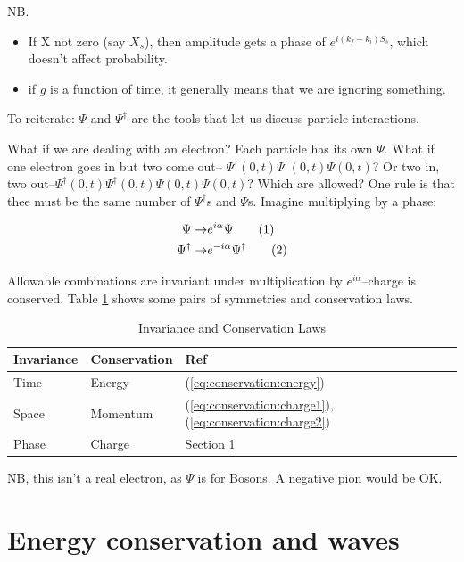 \documentclass[]{article}
\newcommand\numberthis{\addtocounter{equation}{1}\tag{\theequation}}
\begin{document}
NB.\begin{itemize}
	\item  If X not zero (say $X_s$), then amplitude gets a phase of $e^{i(k_f-k_i)S_s}$, which doesn't affect probability.
	\item if $g$ is a function of time, it generally means that we are ignoring something.
\end{itemize}

To reiterate: $\Psi$ and $\Psi^\dagger$ are the tools that let us discuss particle interactions.

What if we are dealing with an electron? Each particle has its own $\Psi$. What if one electron goes in but two come out-- $\Psi^\dagger(0,t)\Psi^\dagger(0,t)\Psi(0,t)$? Or two in, two out--$\Psi^\dagger(0,t)\Psi^\dagger(0,t)\Psi(0,t)\Psi(0,t)$? Which are allowed? One rule is that thee must be the same number of $\Psi^\dagger$s and $\Psi$s. Imagine multiplying by a phase:

\begin{align*}
\Psi \rightarrow & e^{i\alpha} \Psi \numberthis \label{eq:conservation:charge1}\\
\Psi^\dagger \rightarrow & e^{-i\alpha} \Psi^\dagger \numberthis \label{eq:conservation:charge2}
\end{align*}

Allowable combinations are invariant under multiplication by $e^{i\alpha}$--charge is conserved. Table \ref{table:conserve} shows some pairs of symmetries and conservation laws.

\begin{table}[H]
	\caption{Invariance and Conservation Laws}\label{table:conserve}
	\begin{center}
			\begin{tabular}{|l|l|l|}  \hline
				Invariance&Conservation&Ref\\ \hline
				Time& Energy&(\ref{eq:conservation:energy})\\  \hline
				Space&Momentum&(\ref{eq:conservation:charge1}), (\ref{eq:conservation:charge2})\\ \hline
				Phase&Charge&Section \ref{sec:energy:conservation}\\ \hline
			\end{tabular}
	\end{center}
\end{table}

NB, this isn't a real electron, as $\Psi$ is for Bosons. A negative pion would be OK.


\section{Energy conservation and waves}\label{sec:energy:conservation}
\end{document}
